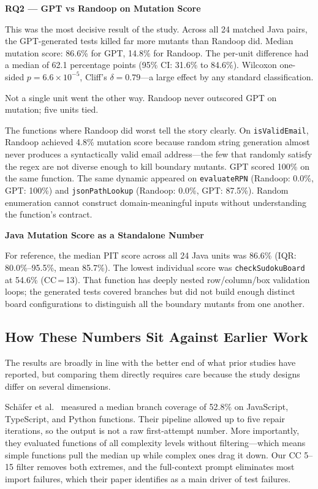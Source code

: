 \documentclass[conference]{IEEEtran}
\begin{document}
\textbf{RQ2 --- GPT vs Randoop on Mutation Score}

This was the most decisive result of the study. Across all 24 matched Java pairs, the GPT-generated tests killed far more mutants than Randoop did. Median mutation score: 86.6\% for GPT, 14.8\% for Randoop. The per-unit difference had a median of 62.1 percentage points (95\% CI: 31.6\% to 84.6\%). Wilcoxon one-sided $p = 6.6\times10^{-5}$, Cliff's $\delta = 0.79$---a large effect by any standard classification.

Not a single unit went the other way. Randoop never outscored GPT on mutation; five units tied.

The functions where Randoop did worst tell the story clearly. On \texttt{isValidEmail}, Randoop achieved 4.8\% mutation score because random string generation almost never produces a syntactically valid email address---the few that randomly satisfy the regex are not diverse enough to kill boundary mutants. GPT scored 100\% on the same function. The same dynamic appeared on \texttt{evaluateRPN} (Randoop: 0.0\%, GPT: 100\%) and \texttt{jsonPathLookup} (Randoop: 0.0\%, GPT: 87.5\%). Random enumeration cannot construct domain-meaningful inputs without understanding the function's contract.

\textbf{Java Mutation Score as a Standalone Number}

For reference, the median PIT score across all 24 Java units was 86.6\% (IQR: 80.0\%--95.5\%, mean 85.7\%). The lowest individual score was \texttt{checkSudokuBoard} at 54.6\% (CC\,=\,13). That function has deeply nested row/column/box validation loops; the generated tests covered branches but did not build enough distinct board configurations to distinguish all the boundary mutants from one another.

\subsection{How These Numbers Sit Against Earlier Work}
\label{sec:disc-prior}

The results are broadly in line with the better end of what prior studies have reported, but comparing them directly requires care because the study designs differ on several dimensions.

Sch{\"a}fer et al.~\cite{schafer2024testpilot} measured a median branch coverage of 52.8\% on JavaScript, TypeScript, and Python functions. Their pipeline allowed up to five repair iterations, so the output is not a raw first-attempt number. More importantly, they evaluated functions of all complexity levels without filtering---which means simple functions pull the median up while complex ones drag it down. Our CC 5--15 filter removes both extremes, and the full-context prompt eliminates most import failures, which their paper identifies as a main driver of test failures.
\end{document}
